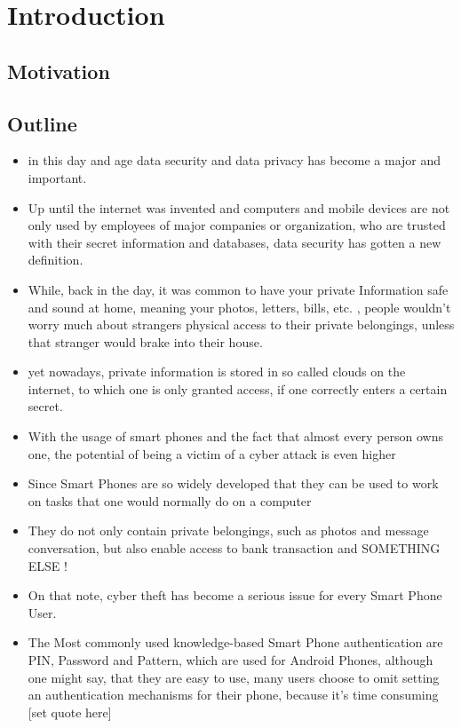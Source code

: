 \chapter{Introduction}\label{ch:first}

\section{Motivation}

\section{Outline}


\begin{itemize}
    \item in this day and age data security and data privacy has become a major and important. 
    \item Up until the internet was invented and computers and mobile devices are not only used by employees of major companies or organization, who are trusted with their secret information and databases, data security has gotten a new definition. 
    \item While, back in the day, it was common to have your private Information safe and sound at home, meaning your photos, letters, bills, etc. , people wouldn't worry much about strangers physical access to their private belongings, unless that stranger would brake into their house. 
    \item yet nowadays, private information is stored in so called clouds on the internet, to which one is only granted access, if one correctly enters a certain secret. 
    \item With the usage of smart phones and the fact that almost every person owns one, the potential of being a victim of a cyber attack is even higher
    \item Since Smart Phones are so widely developed that they can be used to work on tasks that one would normally do on a computer 
    \item They do not only contain private belongings, such as photos and message conversation, but also enable access to bank transaction and SOMETHING ELSE ! 
    \item On that note, cyber theft has become a serious issue for every Smart Phone User.
    \item The Most commonly used knowledge-based Smart Phone authentication are PIN, Password and Pattern, which are used for Android Phones, although one might say, that they are easy to use, many users choose to omit setting an authentication mechanisms for their phone, because it's time consuming [set quote here]

\end{itemize}
